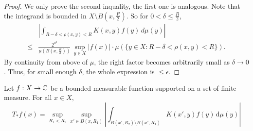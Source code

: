 \begin{proof}
We only prove the second inquality, the first one is analogous.
Note that the integrand is bounded in $X\setminus B(x,\frac{R}{2})$. So for $0<\delta\le\frac{R}{2}$,
\begin{align*}
    &\left| \int_{R-\delta<\rho(x,y)<R} K(x,y) f(y) \, d\mu(y) \right| \\
    \le &\frac{2^{a^3}}{\mu(B(x,\frac{R}{2}))} \, \sup_{y\in X}|f(x)| \cdot \mu(\{y\in X: R-\delta<\rho(x,y)<R\}).
\end{align*}
By continuity from above of $\mu$, the right factor becomes arbitrarily small as $\delta\rightarrow 0$. Thus, for small enough $\delta$, the whole expression is $\le\epsilon$.
\end{proof}

\begin{lemma}\label{tang-unm-op-ball-diff}
    Let $f:X\to{\mathbb{C}}$ be a bounded measurable function supported on a set of finite measure.
    For all $x\in X$,
    \begin{equation}
    \label{tang-unm-op-eq}
        T_*f(x) = \sup_{R_1 < R_2} \sup_{x'\in B(x,R_1)} \left|\int_{B(x',R_2)\setminus B(x',R_1)} K(x',y) f(y) \, \mathrm{d}\mu(y) \right|
    \end{equation}
\end{lemma}
